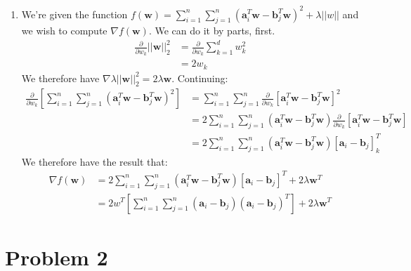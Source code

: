 \documentclass[12pt]{article}
\begin{document}
\begin{enumerate}[label=(\alph*)]
  \item We're given the function $f(\bm{w}) = \sum_{i=1}^n \sum_{j = 1}^n (\bm{a}_i^T\bm{w} - \bm{b}_j^T\bm{w})^2 + \lambda||w||$ and we wish to compute $\nabla f(\bm{w})$. We can do it by parts, first.
  \begin{align*}
    \frac{\partial}{\partial w_k} ||\bm{w}||_2^2 &= \frac{\partial}{\partial w_k} \sum_{k=1}^d w_k^2 \\
    &= 2w_k \tag{ all terms except $w_k$ are zero}
  \end{align*}
  We therefore have $\nabla \lambda ||\bm{w}||_2^2 = 2\lambda\bm{w}$. Continuing:
  \begin{align*}
    \frac{\partial}{\partial w_k}\left[ \sum_{i=1}^n \sum_{j=1}^n (\bm{a}_i^T \bm{w} - \bm{b}_j^T \bm{w})^2 \right] &= \sum_{i=1}^n \sum_{j=1}^n \frac{\partial}{\partial w_k} \left[ \bm{a}_i^T \bm{w} - \bm{b}_j^T \bm{w} \right]^2 \\
    &=  2\sum_{i=1}^n \sum_{j=1}^n (\bm{a}_i^T \bm{w} - \bm{b}_j^T\bm{w})\frac{\partial}{\partial w_k}[\bm{a}_i^T \bm{w} - \bm{b}_j^T \bm {w}] \tag{chain rule} \\
    &= 2 \sum_{i=1}^n \sum_{j=1}^n(\bm{a}_i^T \bm{w} - \bm{b}_j^T \bm{w}) [\bm{a}_i - \bm{b}_j]^T_k
  \end{align*}
  We therefore have the result that:
  \begin{align*}
    \nabla f(\bm{w}) &= 2\sum_{i=1}^n\sum_{j=1}^n (\bm{a}_i^T \bm{w} - \bm{b}_j^T \bm{w})[\bm{a}_i - \bm{b}_j]^T + 2\lambda \bm{w}^T \\
    &= 2w^T\left[\sum_{i=1}^n\sum_{j=1}^n (\bm{a}_i - \bm{b}_j)(\bm{a}_i - \bm{b}_j)^T\right] + 2\lambda \bm{w}^T 
  \end{align*}
\end{enumerate}

\section*{Problem 2}
\end{document}
